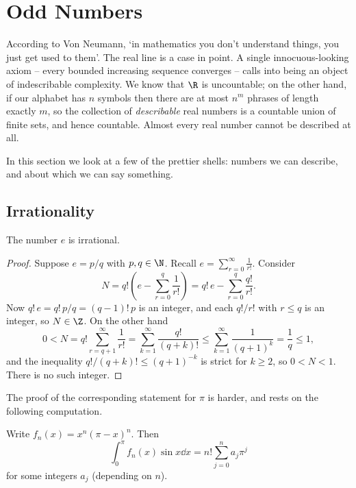 \section{Odd Numbers}

According to Von Neumann, `in mathematics you don't understand things, you just get used to them'. The real line is a case in point. A single innocuous-looking axiom -- every bounded increasing sequence converges -- calls into being an object of indescribable complexity. We know that $\R$ is uncountable; on the other hand, if our alphabet has $n$ symbols then there are at most $n^m$ phrases of length exactly $m$, so the collection of \emph{describable} real numbers is a countable union of finite sets, and hence countable. Almost every real number cannot be described at all.

In this section we look at a few of the prettier shells: numbers we can describe, and about which we can say something.

\subsection{Irrationality}

\begin{theorem}\label{thm:e-irrational}
	The number $e$ is irrational.
\end{theorem}

\begin{proof}
	Suppose $e = p/q$ with $p,q\in\N$. Recall $e = \sum_{r=0}^\infty\frac{1}{r!}$. Consider
	$$N = q!\left(e - \sum_{r=0}^q\frac{1}{r!}\right) = q!\,e - \sum_{r=0}^q\frac{q!}{r!}.$$
	Now $q!\,e = q!\,p/q = (q-1)!\,p$ is an integer, and each $q!/r!$ with $r\leq q$ is an integer, so $N \in\Z$. On the other hand
	$$0 < N = q!\sum_{r=q+1}^\infty\frac{1}{r!} = \sum_{k=1}^\infty\frac{q!}{(q+k)!} \leq \sum_{k=1}^\infty\frac{1}{(q+1)^k} = \frac{1}{q}\leq 1,$$
	and the inequality $q!/(q+k)! \leq (q+1)^{-k}$ is strict for $k\geq2$, so $0<N<1$. There is no such integer.
\end{proof}

The proof of the corresponding statement for $\pi$ is harder, and rests on the following computation.

\begin{lemma}\label{lem:pi-integral}
	Write $f_n(x) = x^n(\pi-x)^n$. Then
	$$\int_0^\pi f_n(x)\sin x\dd x = n!\sum_{j=0}^n a_j\pi^j$$
	for some integers $a_j$ (depending on $n$).
\end{lemma}

